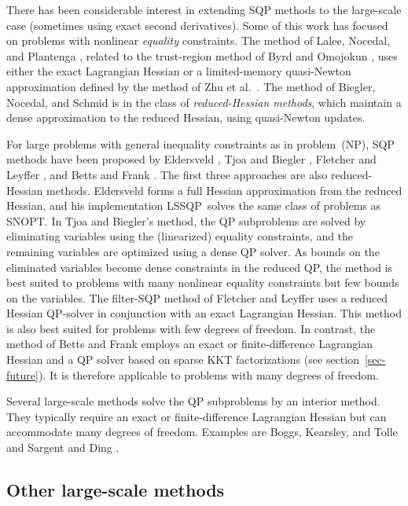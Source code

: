 \documentclass[draft,leqno,onefignum,onetabnum]{siamltex}
\def\etal{et al.}  %
\def\LSSQP {{\small LSSQP}}
\def\SNOPT {{\small SNOPT}}
\begin{document}
There has been considerable interest in extending SQP
methods to the large-scale case (sometimes using exact
second derivatives).  Some of this work has focused on
problems with nonlinear \emph{equality} constraints.  The method of
Lalee, Nocedal, and Plantenga \cite{LNP98},
related to the trust-region method of Byrd \cite{Byr87}
and Omojokun \cite{Omo89},
uses either the exact Lagrangian Hessian or a limited-memory
quasi-Newton approximation defined by the method of Zhu \etal\ \cite{ZBLN97}.
The method of Biegler, Nocedal, and Schmid \cite{BNS95}
is in the class of \emph{reduced-Hessian methods}, which maintain a
dense approximation to the reduced Hessian, using quasi-Newton
updates.

For large problems with general inequality constraints as in
problem~(NP), SQP methods have been proposed by Eldersveld \cite{Eld91},
Tjoa and Biegler \cite{TB91}, Fletcher and Leyffer \cite{FleL98,FleL02}, and
Betts and Frank \cite{BF94}.  The first three approaches are also
reduced-Hessian methods.  Eldersveld forms a full Hessian
approximation from the reduced Hessian, and his implementation \LSSQP\
solves the same class of problems as \SNOPT{}\@.  In Tjoa and Biegler's
method, the QP subproblems are solved by eliminating variables using
the (linearized) equality constraints, and the remaining variables are
optimized using a dense QP solver.  As bounds on the eliminated
variables become dense constraints in the reduced QP, the method is
best suited to problems with many nonlinear equality constraints but
few bounds on the variables.  The filter-SQP method of Fletcher and
Leyffer uses a reduced Hessian QP-solver in conjunction with an exact
Lagrangian Hessian. This method is also best suited for problems with
few degrees of freedom.  In contrast, the method of Betts and Frank
employs an exact or finite-difference Lagrangian Hessian and a QP
solver based on sparse KKT factorizations (see
section~\ref{sec-future}).  It is therefore applicable to problems
with many degrees of freedom.

Several large-scale methods solve the QP subproblems by an interior
method.  They typically require an exact or finite-difference
Lagrangian Hessian but can accommodate many degrees of freedom.
Examples are Boggs, Kearsley, and Tolle \cite{BKT99a,BKT99b} and
Sargent and Ding \cite{SargD00}.


\subsection{Other large-scale methods} \label{sec-Other-methods}
\end{document}
